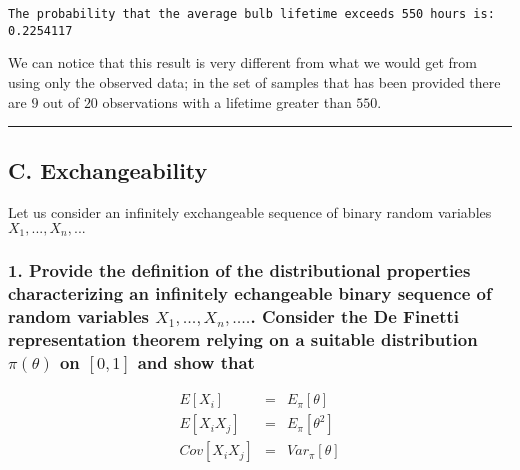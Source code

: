 \documentclass[
]{article}
\begin{document}
\begin{verbatim}
The probability that the average bulb lifetime exceeds 550 hours is: 0.2254117
\end{verbatim}

We can notice that this result is very different from what we would get
from using only the observed data; in the set of samples that has been
provided there are \(9\) out of \(20\) observations with a lifetime
greater than \(550\).

\begin{center}\rule{0.5\linewidth}{0.5pt}\end{center}

\newpage

\hypertarget{c.-exchangeability}{%
\subsection{C. Exchangeability}\label{c.-exchangeability}}

Let us consider an infinitely exchangeable sequence of binary random
variables \(X_1,...,X_n,...\)

\hypertarget{provide-the-definition-of-the-distributional-properties-characterizing-an-infinitely-echangeable-binary-sequence-of-random-variables-x_1-...x_n-.....-consider-the-de-finetti-representation-theorem-relying-on-a-suitable-distribution-pitheta-on-01-and-show-that}{%
\subsubsection{\texorpdfstring{1. Provide the definition of the
distributional properties characterizing an infinitely echangeable
binary sequence of random variables \(X_1, ...,X_n, ....\). Consider the
De Finetti representation theorem relying on a suitable distribution
\(\pi(\theta)\) on \([0,1]\) and show
that}{1. Provide the definition of the distributional properties characterizing an infinitely echangeable binary sequence of random variables X\_1, ...,X\_n, ..... Consider the De Finetti representation theorem relying on a suitable distribution \textbackslash pi(\textbackslash theta) on {[}0,1{]} and show that}}\label{provide-the-definition-of-the-distributional-properties-characterizing-an-infinitely-echangeable-binary-sequence-of-random-variables-x_1-...x_n-.....-consider-the-de-finetti-representation-theorem-relying-on-a-suitable-distribution-pitheta-on-01-and-show-that}}

\begin{eqnarray*} 
E[X_i]&=&E_{\pi}[\theta]\\
E[X_i X_j] &=& E_{\pi}[\theta^2]\\
Cov[X_i X_j] &=& Var_{\pi}[\theta]
\end{eqnarray*}
\end{document}
